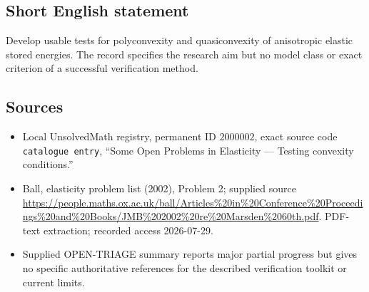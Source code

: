 \documentclass[11pt]{article}
\begin{document}
\subsection{Short English statement}
Develop usable tests for polyconvexity and quasiconvexity of anisotropic elastic stored energies. The record specifies the research aim but no model class or exact criterion of a successful verification method.
\subsection{Sources}
\begin{itemize}
\item Local UnsolvedMath registry, permanent ID \(2000002\), exact source code \texttt{catalogue entry}, ``Some Open Problems in Elasticity --- Testing convexity conditions.''
\item Ball, elasticity problem list (2002), Problem 2; supplied source \url{https://people.maths.ox.ac.uk/ball/Articles%20in%20Conference%20Proceedings%20and%20Books/JMB%202002%20re%20Marsden%2060th.pdf}. PDF-text extraction; recorded access 2026-07-29.
\item Supplied OPEN-TRIAGE summary reports major partial progress but gives no specific authoritative references for the described verification toolkit or current limits.
\end{itemize}
\end{document}
